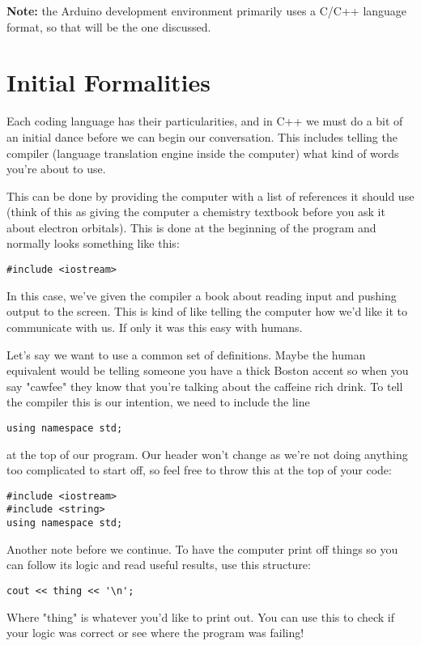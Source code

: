 \documentclass[a4paper]{article}
\begin{document}
\textbf{Note:} the Arduino development environment primarily uses a C/C++ language format, so that will be the one discussed.

\section{Initial Formalities}
\label{sec:formalities}

Each coding language has their particularities, and in C++ we must do a bit of an initial dance before we can begin our conversation. This includes telling the compiler (language translation engine inside the computer) what kind of words you're about to use. 

This can be done by providing the computer with a list of references it should use (think of this as giving the computer a chemistry textbook before you ask it about electron orbitals). This is done at the beginning of the program and normally looks something like this:
\begin{verbatim}
#include <iostream>
\end{verbatim}
In this case, we've given the compiler a book about reading input and pushing output to the screen. This is kind of like telling the computer how we'd like it to communicate with us. If only it was this easy with humans.

Let's say we want to use a common set of definitions. Maybe the human equivalent would be telling someone you have a thick Boston accent so when you say "cawfee" they know that you're talking about the caffeine rich drink. To tell the compiler this is our intention, we need to include the line
\begin{verbatim}
using namespace std;
\end{verbatim}
at the top of our program. Our header won't change as we're not doing anything too complicated to start off, so feel free to throw this at the top of your code:

\begin{verbatim}
#include <iostream>
#include <string>
using namespace std;
\end{verbatim}

Another note before we continue. To have the computer print off things so you can follow its logic and read useful results, use this structure:

\begin{verbatim}
cout << thing << '\n';
\end{verbatim}

Where "thing" is whatever you'd like to print out. You can use this to check if your logic was correct or see where the program was failing!
\end{document}
